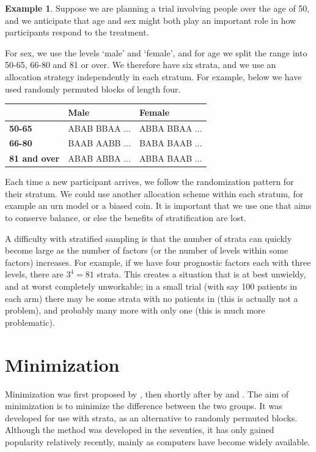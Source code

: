 \documentclass[
  openany]{book}
\theoremstyle{definition}
\theoremstyle{definition}
\newtheorem{example}{Example}[chapter]
\theoremstyle{definition}
\theoremstyle{definition}
\theoremstyle{remark}
\begin{document}
\begin{example}
Suppose we are planning a trial involving people over the age of 50, and we anticipate that age and sex might both play an important role in how participants respond to the treatment.

For sex, we use the levels `male' and `female', and for age we split the range into 50-65, 66-80 and 81 or over. We therefore have six strata, and we use an allocation strategy independently in each stratum. For example, below we have used randomly permuted blocks of length four.

\begin{tabular}{>{}l|l|l}
\hline
  & Male & Female\\
\hline
\textbf{50-65} & ABAB BBAA ... & ABBA BBAA ...\\
\hline
\textbf{66-80} & BAAB AABB ... & BABA BAAB ...\\
\hline
\textbf{81 and over} & ABAB ABBA ... & ABBA BAAB ...\\
\hline
\end{tabular}

Each time a new participant arrives, we follow the randomization pattern for their stratum. We could use another allocation scheme within each stratum, for example an urn model or a biased coin. It is important that we use one that aims to conserve balance, or else the benefits of stratification are lost.
\end{example}

A difficulty with stratified sampling is that the number of strata can quickly become large as the number of factors (or the number of levels within some factors) increases. For example, if we have four prognostic factors each with three levels, there are \(3^4=81\) strata. This creates a situation that is at best unwieldy, and at worst completely unworkable; in a small trial (with say 100 patients in each arm) there may be some strata with no patients in (this is actually not a problem), and probably many more with only one (this is much more problematic).

\hypertarget{minimization}{%
\section{Minimization}\label{minimization}}

Minimization was first proposed by \citet{taves1974minimization}, then shortly after by \citet{pocock1975sequential} and \citet{freedman1976use}. The aim of minimization is to minimize the difference between the two groups. It was developed for use with strata, as an alternative to randomly permuted blocks. Although the method was developed in the seventies, it has only gained popularity relatively recently, mainly as computers have become widely available.
\end{document}
